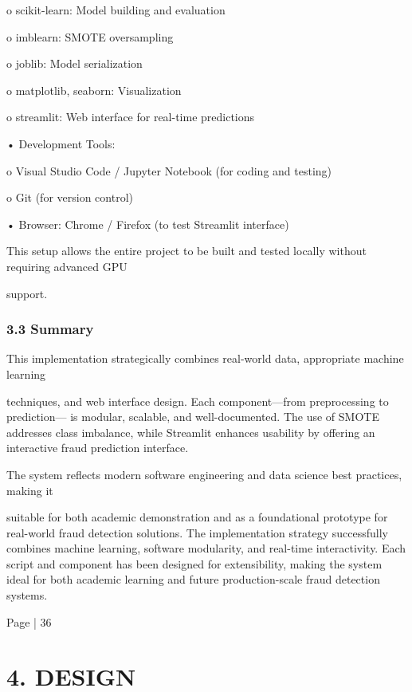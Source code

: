 \documentclass[11pt,a4paper]{article}
\begin{document}
o scikit-learn: Model building and evaluation 

o imblearn: SMOTE oversampling 

o joblib: Model serialization 

o matplotlib, seaborn: Visualization 

o streamlit: Web interface for real-time predictions 

• 
Development Tools: 

\begin{center}
o Visual Studio Code / Jupyter Notebook (for coding and testing) 
\end{center}

o Git (for version control) 

• 
Browser: Chrome / Firefox (to test Streamlit interface) 

This setup allows the entire project to be built and tested locally without requiring advanced GPU 

support. 

\subsubsection*{3.3 Summary }

This implementation strategically combines real-world data, appropriate machine learning 

techniques, and web interface design. Each component—from preprocessing to prediction—
is modular, scalable, and well-documented. The use of SMOTE addresses class imbalance, 
while Streamlit enhances usability by offering an interactive fraud prediction interface. 

The system reflects modern software engineering and data science best practices, making it 

suitable for both academic demonstration and as a foundational prototype for real-world 
fraud detection solutions. The implementation strategy successfully combines machine 
learning, software modularity, and real-time interactivity. Each script and component has 
been designed for extensibility, making the system ideal for both academic learning and 
future production-scale fraud detection systems. 

Page | 36  

\newpage

\section*{4. DESIGN }
\end{document}
